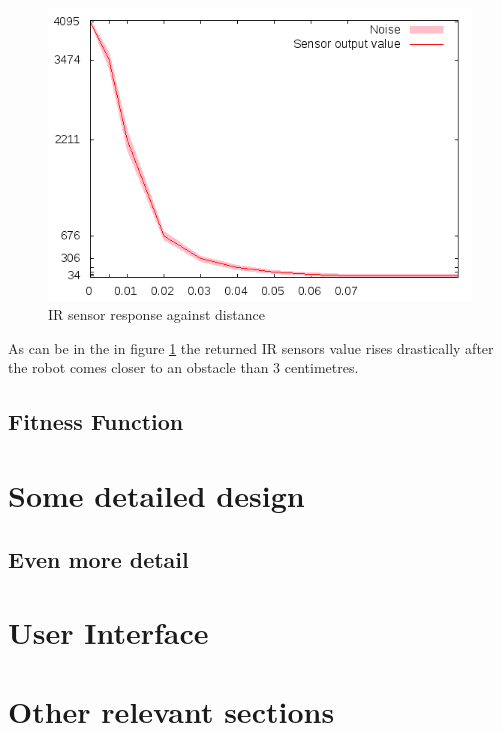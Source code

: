 \begin{figure}[h]
\begin{center}
\includegraphics[scale=0.3]{Chapter2/images/Selection_002.png} 
\caption[IR sensor response against distance]{IR sensor response against distance\footnotemark}
\label{fig:ir_distance}
\end{center}
\end{figure} 


As can be in the in figure \ref{fig:ir_distance} the returned IR sensors value rises drastically after the robot comes closer to an obstacle than 3 centimetres. 

\subsection{Fitness Function}\label{chap2:fitness_function}

\section{Some detailed design}

\subsection{Even more detail}

\section{User Interface}

\section{Other relevant sections}